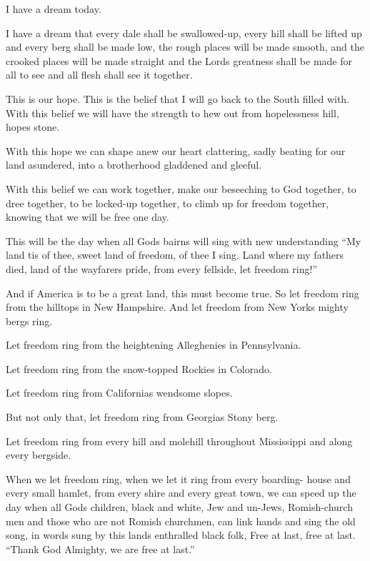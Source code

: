 I have a dream today.

I have a dream that every dale shall be swallowed-up, every hill
shall be lifted up and every berg shall be made low, the rough
places will be made smooth, and the crooked places will be made
straight and the Lord\textquotesingle{}s greatness shall be made
for all to see and all flesh shall see it together.

This is our hope. This is the belief that I will go back to the
South filled with. With this belief we will have the strength to
hew out from hopelessness\textquotesingle{} hill,
hope\textquotesingle{}s stone.

With this hope we can shape anew our heart clattering, sadly
beating for our land asundered, into a brotherhood gladdened and
gleeful.

With this belief we can work together, make our beseeching to God
together, to dree together, to be locked-up together, to climb up
for freedom together, knowing that we will be free one day.

This will be the day when all God\textquotesingle{}s bairns will
sing with new understanding ``My land \textquotesingle{}tis of
thee, sweet land of freedom, of thee I sing. Land where my fathers
died, land of the wayfarer\textquotesingle{}s pride, from every
fellside, let freedom ring!''

And if America is to be a great land, this must become true. So
let freedom ring from the hilltops in New Hampshire. And let
freedom from New York\textquotesingle{}s mighty bergs ring.

Let freedom ring from the heightening Alleghenies in Pennsylvania.

Let freedom ring from the snow-topped Rockies in Colorado.

Let freedom ring from California\textquotesingle{}s wendsome
slopes.

But not only that, let freedom ring from
Georgia\textquotesingle{}s Stony berg.

Let freedom ring from every hill and molehill throughout
Mississippi and along every bergside.

When we let freedom ring, when we let it ring from every boarding-
house and every small hamlet, from every shire and every great
town, we can speed up the day when all God\textquotesingle{}s
children, black and white, Jew and un-Jews, Romish-church men and
those who are not Romish churchmen, can link hands and sing the
old song, in words sung by this land\textquotesingle{}s enthralled
black folk, Free at last, free at last. ``Thank God Almighty, we
are free at last.''
